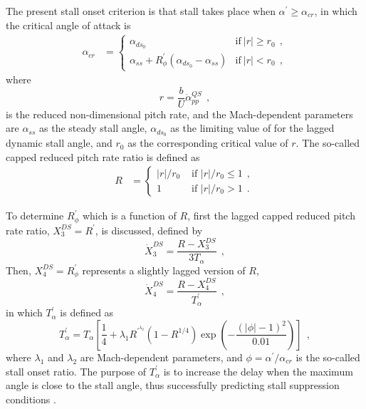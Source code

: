 \documentclass[12pt,a4paper,oneside,english]{abntex2} %
\newcommand{\abs}[1]{\lvert#1\rvert}
\def\lb{\left[}
\def\rb{\right]}
\def\lp{\left(}
\def\rp{\right)}
\def\alphadot{\dot{\alpha}}
\def\alphalag{\alpha^\prime}
\begin{document}
The present stall onset criterion is that stall takes place when $\alphalag \geq \alpha_{cr}$, in which the critical angle of attack is  
\begin{align}
    \alpha_{cr} &=
	\begin{cases}
	   \alpha_{ds_0} &\text{if} \ \abs{r} \geq r_0 \ \ ,
	\\ 		              
        \alpha_{ss}+ R_\phi^{\prime} \lp \alpha_{ds_0}-\alpha_{ss} \rp &\text{if} \ \abs{r} < r_0 \ \ ,
	\end{cases} 
    \label{eq:alpha_cr} 
\end{align}
where
\begin{equation}
    r = \frac{b}{U}\alphadot_{pp}^{QS} \ \ ,
    \label{eq:r}
\end{equation}
is the reduced non-dimensional pitch rate, and the Mach-dependent parameters are $\alpha_{ss}$ as the steady stall angle, $\alpha_{ds_0}$ as the limiting value of for the lagged dynamic stall angle, and $r_0$ as the corresponding critical value of $r$. The so-called capped reduced pitch rate ratio is defined as
\begin{align}
    R &= 
    \begin{cases}
      \abs{r}/r_0 &\text{ if } \abs{r}/r_0 \leq 1 \ \ ,
      \\
      1 &\text{ if } \abs{r}/r_0 > 1 \ \ .
    \end{cases} 
    \label{eq:R} 
\end{align}

To determine $R_\phi^{\prime}$ which is a function of $R$, first the
lagged capped reduced pitch rate ratio, $X_3^{DS}=R^{\prime}$, is discussed, defined by
\begin{equation}
    \dot{X}_{3}^{DS} = \frac{R-X_{3}^{DS}}{3 T_\alpha} \ \ ,
    \label{eq:R_prime_state} 
\end{equation}
Then, $X_4^{DS}=R_\phi^{\prime}$ represents a slightly lagged version of $R$, 
\begin{equation}
    \dot{X}_{4}^{DS} = \frac{R-X_{4}^{DS}}{T_\alpha^{\prime}} \ \ ,
    \label{eq:R_phi_prime_state} 
\end{equation}
in which $T_\alpha^{\prime}$ is defined as
\begin{equation}
    T_\alpha^{\prime} =  T_\alpha \lb\frac{1}{4}+\lambda_1 R^{\prime^{\lambda_2}}\lp1-R^{1/4}\rp\exp{\lp-\frac{(\abs{\phi}-1)^2}{0.01}\rp}\rb \ \ ,
    \label{eq:Talphaprime} 
\end{equation}
where $\lambda_1$ and $\lambda_2$ are Mach-dependent parameters, and $\phi=\alphalag/\alpha_{cr}$ is the so-called stall onset ratio. The purpose of $T_\alpha^{\prime}$ is to increase the delay when the maximum angle is close to the stall angle, thus successfully predicting stall suppression conditions \cite{dossantos2021improvements}.
\end{document}
